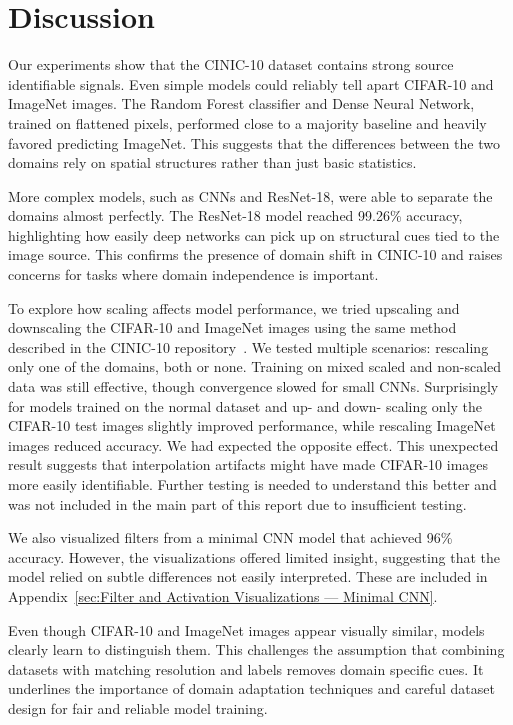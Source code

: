\section{Discussion}

Our experiments show that the CINIC-10 dataset contains strong source identifiable signals. Even simple models could reliably tell apart CIFAR-10 
and ImageNet images. The Random Forest classifier and Dense Neural Network, trained on flattened pixels, performed close to a majority baseline and 
heavily favored predicting ImageNet. This suggests that the differences between the two domains rely on spatial structures rather than just basic 
statistics.

More complex models, such as CNNs and ResNet-18, were able to separate the domains almost perfectly. The ResNet-18 model reached 99.26\% accuracy, 
highlighting how easily deep networks can pick up on structural cues tied to the image source. This confirms the presence of domain shift in 
CINIC-10 and raises concerns for tasks where domain independence is important.

To explore how scaling affects model performance, we tried upscaling and downscaling the CIFAR-10 and ImageNet images using the same method 
described in the CINIC-10 repository~\cite{cinic10_github}. We tested multiple scenarios: rescaling only one of the domains, both or none. 
Training on mixed scaled and non-scaled data was still effective, though convergence slowed for small CNNs. Surprisingly for models trained on the 
normal dataset and up- and down- scaling only the CIFAR-10 test images slightly improved performance, while rescaling ImageNet images reduced 
accuracy. We had expected the opposite effect. This unexpected result suggests that interpolation artifacts might have made CIFAR-10 images more 
easily identifiable. Further testing is needed to understand this better and was not included in the main part of this report due to insufficient testing.

We also visualized filters from a minimal CNN model that achieved 96\% accuracy. However, the visualizations offered limited insight, suggesting 
that the model relied on subtle differences not easily interpreted. These are included in 
Appendix~\ref{sec:Filter and Activation Visualizations — Minimal CNN}.

Even though CIFAR-10 and ImageNet images appear visually similar, models clearly learn to distinguish them. This challenges the assumption that 
combining datasets with matching resolution and labels removes domain specific cues. It underlines the importance of domain adaptation techniques 
and careful dataset design for fair and reliable model training.
